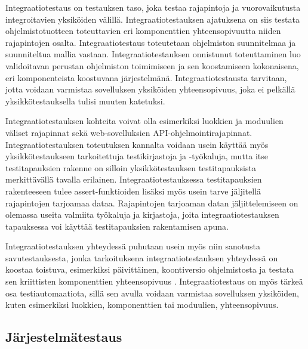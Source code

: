     Integraatiotestaus on testauksen taso, joka testaa rajapintoja ja vuorovaikutusta integroitavien yksiköiden välillä.
    Integraatiotestauksen ajatuksena on siis testata ohjelmistotuotteen toteuttavien eri komponenttien yhteensopivuutta niiden rajapintojen osalta.
    Integraatiotestaus toteutetaan ohjelmiston suunnitelmaa ja suunniteltua mallia vastaan.
    Integraatiotestauksen onnistunut toteuttaminen luo validoitavan perustan ohjelmiston toimimiseen ja sen koostamiseen kokonaisena, eri komponenteista koostuvana järjestelmänä.
    Integraatiotestausta tarvitaan, jotta voidaan varmistaa sovelluksen yksiköiden yhteensopivuus, joka ei pelkällä yksikkötestauksella tulisi muuten katetuksi. \cite{istqb_glossary_v3_3} \cite{testing_levels_webpage}

    Integraatiotestauksen kohteita voivat olla esimerkiksi luokkien ja moduulien väliset rajapinnat sekä web-sovelluksien API-ohjelmointirajapinnat.
    Integraatiotestauksen toteutuksen kannalta voidaan usein käyttää myös yksikkötestaukseen tarkoitettuja testikirjastoja ja -työkaluja, mutta itse testitapauksien rakenne on silloin yksikkötestauksen testitapauksista merkittävällä tavalla erilainen.
    Integraatiotestauksessa testitapauksien rakenteeseen tulee assert-funktioiden lisäksi myös usein tarve jäljitellä rajapintojen tarjoamaa dataa.
    Rajapintojen tarjoaman datan jäljittelemiseen on olemassa useita valmiita työkaluja ja kirjastoja, joita integraatiotestauksen tapauksessa voi käyttää testitapauksien rakentamisen apuna.

    Integraatiotestauksen yhteydessä puhutaan usein myös niin sanotusta savutestauksesta, jonka tarkoituksena integraatiotestauksen yhteydessä on koostaa toistuva, esimerkiksi päivittäinen, koontiversio ohjelmistosta ja testata sen kriittisten komponenttien yhteensopivuus \cite{testing_levels_webpage}.
    Integraatiotestaus on myös tärkeä osa testiautomaatiota, sillä sen avulla voidaan varmistaa sovelluksen yksiköiden, kuten esimerkiksi luokkien, komponenttien tai moduulien, yhteensopivuus.

  \subsection{Järjestelmätestaus} \label{ch:07_jarjestelmatestaus}

